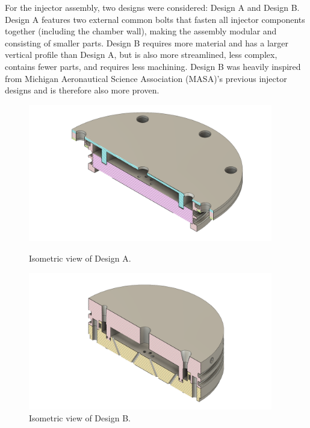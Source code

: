 \documentclass[9pt]{article} %
\numberwithin{equation}{section} %
\begin{document}
For the injector assembly, two designs were considered: Design A and Design B. Design A features two external common bolts that fasten all injector components together (including the chamber wall), making the assembly modular and consisting of smaller parts. Design B requires more material and has a larger vertical profile than Design A, but is also more streamlined, less complex, contains fewer parts, and requires less machining. Design B was heavily inspired from Michigan Aeronautical Science Association (MASA)'s previous injector designs and is therefore also more proven.

\begin{figure}[H]
    \centering
    \begin{minipage}{0.495\textwidth}
        \centering
        \includegraphics[scale=0.5, width=0.95\textwidth, trim={4cm 1cm 4cm 1cm}, clip]{cad_files/Daniel Injector CAD.png} %
        \caption{Isometric view of Design A.}
        \label{fig:design_a}
    \end{minipage}\hfill
    \begin{minipage}{0.495\textwidth}
        \centering
        \includegraphics[scale=0.5, width=0.95\textwidth, trim={4cm 1cm 4cm 1cm}, clip]{cad_files/Final Injector Assembly ISO1.png} %
        \caption{Isometric view of Design B.}
        \label{fig:design_b}
    \end{minipage}
\end{figure} 
\end{document}
